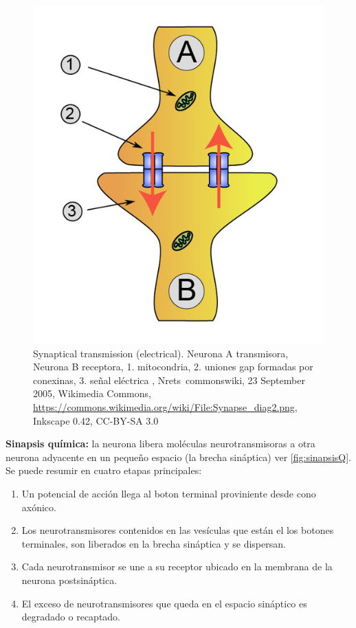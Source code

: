 \begin{figure}[h]
 \centering
 \includegraphics[scale=0.4]{../Figuras/sinapsisElectrica.png}
 \caption{Synaptical transmission (electrical). Neurona A transmisora, Neurona B receptora, 1. mitocondria, 2. uniones gap formadas por conexinas, 3. señal eléctrica , Nrets~commonswiki, 23 September 2005, Wikimedia Commons, \url{https://commons.wikimedia.org/wiki/File:Synapse_diag2.png}, Inkscape 0.42, CC-BY-SA 3.0}
 \label{fig:sinapsisN}
\end{figure}
 
 \textbf{Sinapsis química:} la neurona libera moléculas neurotransmisoras a otra neurona adyacente en un pequeño espacio (la brecha sináptica) ver \ref{fig:sinapsisQ}. Se puede resumir en cuatro etapas principales:

\begin{enumerate}
 \item Un potencial de acción llega al boton terminal proviniente desde cono axónico.
 \item Los neurotransmisores contenidos en las vesículas que están el los botones terminales, son liberados en la brecha sináptica y se dispersan.
 \item Cada neurotransmisor se une a su receptor ubicado en la membrana de la neurona postsináptica.
 \item El exceso de neurotransmisores que queda en el espacio sináptico es degradado o recaptado.
\end{enumerate}

